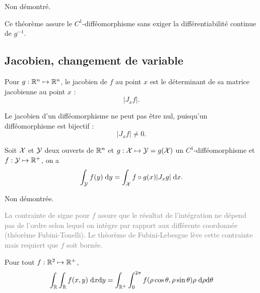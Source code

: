 \proof Non démontré. \eproof

\remark
Ce théorème assure le $C^1$-difféomorphisme sans exiger la différentiabilité continue de $g^{-1}$.

\subsection{Jacobien, changement de variable}

\begin{definition}[Jacobien]
  Pour $g : \mathbb{R}^n \mapsto \mathbb{R}^n$, le jacobien de $f$ au point $x$ est le déterminant de sa matrice jacobienne au point $x$ : 
  $$
  |J_x f|.
  $$
\end{definition}

\remark
Le jacobien d'un difféomorphisme ne peut pas être nul, puisqu'un difféomorphisme est bijectif :
$$
|J_x f| \neq 0.
$$

\begin{theorem}
  Soit $\mathcal{X}$ et $\mathcal{Y}$ deux ouverts de $\mathbb{R}^n$ et $g : \mathcal{X} \mapsto \mathcal{Y} = g(\mathcal{X})$ un $C^1$-difféomorphisme et $f : \mathcal{Y} \mapsto \mathbb{R}^+$, on a 
  $$
  \int_{\mathcal{Y}} f(y) \; \text{d} y = \int_{\mathcal{X}} f \circ g(x) |J_x g| \; \text{d} x.
  $$
\end{theorem}

\proof
Non démontrée.
\eproof

\textcolor{gray}{\remark
La contrainte de signe pour $f$ assure que le résultat de l'intégration ne dépend pas de l'ordre selon lequel on intègre par rapport aux différente coordonnée (théorème Fubini-Tonelli). Le théorème de Fubini-Lebesgue lève cette contrainte mais requiert que $f$ soit bornée.}

\begin{corollary*}
  Pour tout $f : \mathbb{R}^2 \mapsto \mathbb{R}^+$, 
  $$
  \int_{\mathbb{R}} \int_{\mathbb{R}} f(x, y) \; \text{d} x \text{d} y
  = \int_{\mathbb{R}^+} \int_0^{2 \pi} f(\rho \cos \theta, \rho \sin \theta) \rho \; \text{d} \rho \text{d} \theta
  $$
\end{corollary*}

